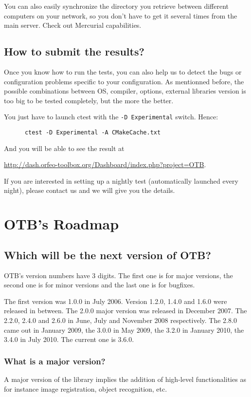 You can also easily synchronize the directory you retrieve between different computers on your network, so you don't have to get it several times from the main server. Check out Mercurial capabilities.

\subsection{How to submit the results?}

Once you know how to run the tests, you can also help us to detect the bugs or configuration problems specific to your configuration. As mentionned before, the possible combinations between OS, compiler, options, external libraries version is too big to be tested completely, but the more the better.

You just have to launch ctest with the \texttt{-D Experimental} switch. Hence:
\begin{verbatim}
      ctest -D Experimental -A CMakeCache.txt
\end{verbatim}

And you will be able to see the result at

\url{http://dash.orfeo-toolbox.org/Dashboard/index.php?project=OTB}.

If you are interested in setting up a nightly test (automatically launched every night), please contact us and we will give you the details.

\section{OTB's Roadmap}

\subsection{Which will be the next version of OTB?}
OTB's version numbers have 3 digits. The first one is for major
versions, the second one is for minor versions and the last one is for
bugfixes.

The first version was 1.0.0 in July 2006. Version 1.2.0, 1.4.0 and 1.6.0 were
released in between. The 2.0.0 major version  was released in December 2007.
The 2.2.0, 2.4.0 and 2.6.0 in June, July and November 2008 respectively. The
2.8.0 came out in January 2009, the 3.0.0 in May 2009, the 3.2.0 in January 2010, the 3.4.0 in July 2010. The current one is 3.6.0.

\subsubsection{What is a major version?}
A major version of the library implies the addition of high-level
functionalities as for instance image registration, object recognition, etc.

